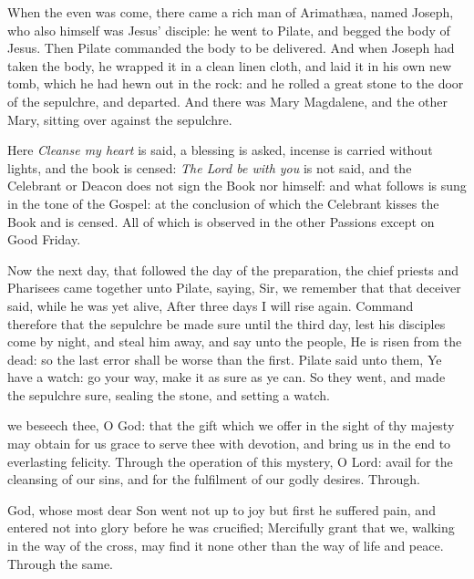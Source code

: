 When the even was come, there came a rich man of Arimath{\ae}a, named Joseph, who also himself was Jesus' disciple: he went to Pilate, and begged the body of Jesus. Then Pilate commanded the body to be delivered. And when Joseph had taken the body, he wrapped it in a clean linen cloth, and laid it in his own new tomb, which he had hewn out in the rock: and he rolled a great stone to the door of the sepulchre, and departed. And there was Mary Magdalene, and the other Mary, sitting over against the sepulchre.
\begin{rubric}
    Here \emph{Cleanse my heart} is said, a blessing is asked, incense is carried without lights, and the book is censed: \emph{The Lord be with you} is not said, and the Celebrant or Deacon does not sign the Book nor himself: and what follows is sung in the tone of the Gospel: at the conclusion of which the Celebrant kisses the Book and is censed. All of which is observed in the other Passions except on Good Friday.
\end{rubric}
Now the next day, that followed the day of the preparation, the chief priests and Pharisees came together unto Pilate, saying, Sir, we remember that that deceiver said, while he was yet alive, After three days I will rise again. Command therefore that the sepulchre be made sure until the third day, lest his disciples come by night, and steal him away, and say unto the people, He is risen from the dead: so the last error shall be worse than the first. Pilate said unto them, Ye have a watch: go your way, make it as sure as ye can. So they went, and made the sepulchre sure, sealing the stone, and setting a watch.

\secret
{} we beseech thee, O God: that the gift which we offer in the sight of thy majesty may obtain for us grace to serve thee with devotion, and bring us in the end to everlasting felicity. Through
\postcommunion
{} the operation of this mystery, O Lord: avail for the cleansing of our sins, and for the fulfilment of our godly desires. Through.

{}
	 God, whose most dear Son went not up to joy but first he suffered pain, and entered not into glory before he was crucified; Mercifully grant that we, walking in the way of the cross, may find it none other than the way of life and peace. Through the same.

